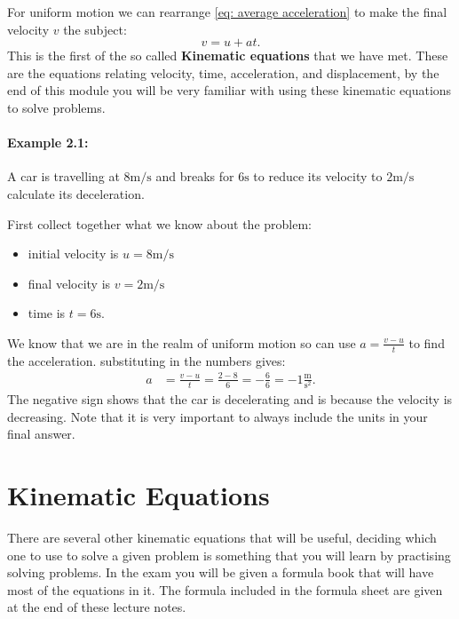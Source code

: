 \documentclass[a4paper,12pt]{book}
\begin{document}
For uniform motion we can rearrange \cref{eq: average acceleration} to make the final velocity $v$ the subject:
\begin{equation}
    v=u+at.
    \label{eq: Kinematic equation 1}
\end{equation}
This is the first of the so called \textbf{Kinematic equations} that we have met. These are the equations relating velocity, time, acceleration, and displacement, by the end of this module you will be very familiar with using these kinematic equations to solve problems. 

\paragraph{Example 2.1:} A car is travelling at $8\text{m/s}$ and breaks for $6\text{s}$  to reduce its velocity to $2\text{m/s}$ calculate its deceleration.

First collect together what we know about the problem:
\begin{itemize}
\setlength{\itemsep}{-5pt}
    \item initial velocity is $u=8\text{m/s}$
    \item final velocity is $v=2\text{m/s}$
    \item time is $t=6\text{s}$.
\end{itemize}
We know that we are in the realm of uniform motion so can use $a=\frac{v-u}{t}$ to find the acceleration. substituting in the numbers gives:
\begin{align*}
    a&=\frac{v-u}{t}=\frac{2-8}{6}=-\frac{6}{6}=-1\frac{\text{m}}{\text{s}^{2}}.
\end{align*}
The negative sign shows that the car is decelerating and is because the velocity is decreasing. Note that it is very important to always include the units in your final answer.\\

\vspace{2cm}

\section{Kinematic Equations}
There are several other kinematic equations that will be useful, deciding which one to use to solve a given problem is something that you will learn by practising solving problems. In the exam you will be given a formula book that will have most of the equations in it. The formula included in the formula sheet are given at the end of these lecture notes.\\
\end{document}
